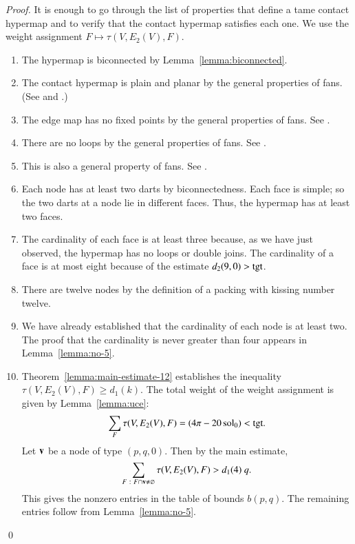 \documentclass{llncs}
\def\op#1{{\hbox{#1}}}
\begin{document}
\begin{proof} It is enough to go through the list of properties that
  define a tame contact hypermap and to verify that the contact
  hypermap satisfies each one.  We use the weight assignment $F\mapsto
  \tau(V,E_2(V),F)$.

\begin{enumerate}
\item {} The hypermap is biconnected by
  Lemma~\ref{lemma:biconnected}.
\item {} The contact hypermap is plain and planar by the
  general properties of fans.  (See \cite[Lemma~5.8]{DSP} and \cite[5.3]{DSP}.)
\item {} The
  edge map has no fixed points by the general properties of fans.
See \cite[Lemma~5.8]{DSP}.
\item {} 
  There are no loops by the general properties of
  fans. See \cite[Lemma~5.8]{DSP}.
\item {} This is also a general property of fans. See \cite[Lemma~5.8]{DSP}.
\item {} Each node has at least two darts by
  biconnectedness. Each face is simple; so the two darts at a node lie
  in different faces.  Thus, the hypermap has at least two faces.
\item {} The cardinality of each face is at least three
  because, as we have just observed, the hypermap has no loops or double joins.
  The cardinality of a face is at most eight because of the estimate
  $d_2(9,0)>\op{tgt}$.
\item {} There are twelve nodes by the definition of a
  packing with kissing number twelve.
\item {} We have already established that the cardinality
  of each node is at least two.  The proof that the cardinality is
  never  greater than four appears in Lemma~\ref{lemma:no-5}.
\item {} Theorem~\ref{lemma:main-estimate-12} establishes 
 the inequality $\tau(V,E_2(V),F)\ge d_1(k)$.
  The total weight of the weight assignment is given by
  Lemma~\ref{lemma:uce}:
\[
  \sum_F \tau(V,E_2(V),F) = (4\pi - 20\sol_0) < \op{tgt}.
\]
%
Let ${\mathbf v}$ be a node of type $(p,q,0)$.  
Then by the main estimate,
\[
\sum_{F\ :\  F\cap {\mathbf v}\ne\varnothing}\tau(V,E_2(V),F) > d_1(4)~q.
\]
This gives the nonzero entries in the table of bounds $b(p,q)$.  The
remaining entries follow from Lemma~\ref{lemma:no-5}.
\end{enumerate}
\qed\end{proof}
\end{document}
